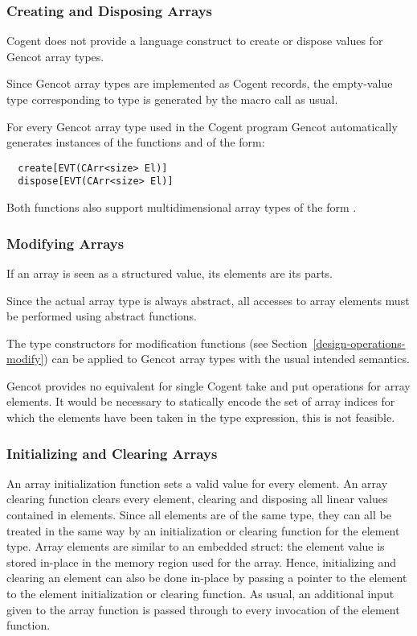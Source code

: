 \subsubsection{Creating and Disposing Arrays}

Cogent does not provide a language construct to create or dispose values for Gencot array types.

Since Gencot array types are implemented as Cogent records, the empty-value type corresponding to type  
is generated by the macro call  as 
usual.

For every Gencot array type  used in the Cogent program Gencot automatically
generates instances of the functions  and  of the form:
\begin{verbatim}
  create[EVT(CArr<size> El)]
  dispose[EVT(CArr<size> El)]
\end{verbatim}

Both functions also support multidimensional array types of the form .

\subsubsection{Modifying Arrays}

If an array is seen as a structured value, its elements are its parts.

Since the actual array type is always abstract, all accesses to array elements must be performed using abstract functions.

The type constructors for modification functions (see Section~\ref{design-operations-modify}) can be applied to 
Gencot array types with the usual intended semantics. 

Gencot provides no equivalent for single Cogent take and put operations for array elements. It would be
necessary to statically encode the set of array indices for which the elements have been taken in the type expression,
this is not feasible.

\subsubsection{Initializing and Clearing Arrays}

An array initialization function sets a valid value for every element. An array clearing function clears every element, 
clearing and disposing all linear values contained in elements. Since all elements are of the same type, they can all be
treated in the same way by an initialization or clearing function for the element type. Array elements are similar to
an embedded struct: the element value is stored in-place in the memory region used for the array. Hence, initializing and 
clearing an element can also be done in-place by passing a pointer to the element to the element initialization or 
clearing function. As usual, an additional input given to the array function is passed through to every invocation 
of the element function. 

